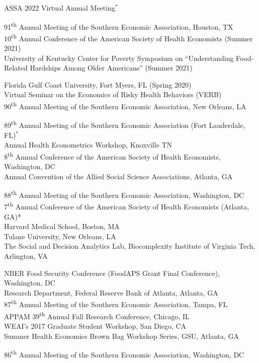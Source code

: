 \documentclass[12pt,letterpaper]{article}
\begin{document}
\begin{description}[font=\mdseries]
	ASSA 2022 Virtual Annual Meeting$^*$
	\item[2021] 91\textsuperscript{th} Annual Meeting of the Southern Economic Association, Houston, TX \\
	10\textsuperscript{th} Annual Conference of the American Society of Health Economists (Summer 2021)\\
	University of Kentucky Center for Poverty Symposium on ``Understanding Food-Related Hardships Among Older Americans''  (Summer 2021)
	\item[2020] Florida Gulf Coast University, Fort Myers, FL (Spring 2020) \\
	Virtual Seminar on the Economics of Risky Health Behaviors (VERB) \\
	90\textsuperscript{th} Annual Meeting of the Southern Economic Association, New Orleans, LA
	\item[2019] 89\textsuperscript{th} Annual Meeting of the Southern Economic Association (Fort Lauderdale, FL)$^*$\\
	Annual Health Econometrics Workshop, Knoxville TN\\
	8\textsuperscript{th} Annual Conference of the American Society of Health Economists, Washington, DC\\
	Annual Convention of the Allied Social Science Associations, Atlanta, GA
	\item[2018] 88\textsuperscript{th} Annual Meeting of the Southern Economic Association, Washington, DC\\
	7\textsuperscript{th} Annual Conference of the American Society of Health Economists (Atlanta, GA)*\\
	Harvard Medical School, Boston, MA \\
	Tulane University, New Orleans, LA \\  
	The Social and Decision Analytics Lab, Biocomplexity Institute of Virginia Tech, Arlington, VA
	\item[2017] NBER Food Security Conference (FoodAPS Grant Final Conference), Washington, DC \\
	Research Department, Federal Reserve Bank of Atlanta, Atlanta, GA \\ 
	87\textsuperscript{th} Annual Meeting of the Southern Economic Association, Tampa, FL \\ 
	APPAM 39\textsuperscript{th} Annual Fall Research Conference, Chicago, IL \\ 
	WEAI's 2017 Graduate Student Workshop, San Diego, CA \\
	Summer Health Economics Brown Bag Workshop Series, GSU, Atlanta, GA
	\item[2016] 86\textsuperscript{th} Annual Meeting of the Southern Economic Association, Washington, DC
\end{description}
\end{document}
